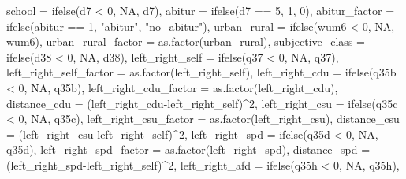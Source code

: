 \documentclass[
]{article}
\newenvironment{Shaded}{\begin{snugshade}}{\end{snugshade}}
\newcommand{\AttributeTok}[1]{\textcolor[rgb]{0.77,0.63,0.00}{#1}}
\newcommand{\ConstantTok}[1]{\textcolor[rgb]{0.00,0.00,0.00}{#1}}
\newcommand{\DecValTok}[1]{\textcolor[rgb]{0.00,0.00,0.81}{#1}}
\newcommand{\FunctionTok}[1]{\textcolor[rgb]{0.00,0.00,0.00}{#1}}
\newcommand{\NormalTok}[1]{#1}
\newcommand{\SpecialCharTok}[1]{\textcolor[rgb]{0.00,0.00,0.00}{#1}}
\newcommand{\StringTok}[1]{\textcolor[rgb]{0.31,0.60,0.02}{#1}}
\begin{document}
\begin{Shaded}
\begin{Highlighting}[]
         \AttributeTok{school =} \FunctionTok{ifelse}\NormalTok{(d7 }\SpecialCharTok{\textless{}} \DecValTok{0}\NormalTok{, }\ConstantTok{NA}\NormalTok{, d7),}
         \AttributeTok{abitur =} \FunctionTok{ifelse}\NormalTok{(d7 }\SpecialCharTok{==} \DecValTok{5}\NormalTok{, }\DecValTok{1}\NormalTok{, }\DecValTok{0}\NormalTok{),}
         \AttributeTok{abitur\_factor =} \FunctionTok{ifelse}\NormalTok{(abitur }\SpecialCharTok{==} \DecValTok{1}\NormalTok{, }\StringTok{"abitur"}\NormalTok{, }\StringTok{"no\_abitur"}\NormalTok{),}
         \AttributeTok{urban\_rural =} \FunctionTok{ifelse}\NormalTok{(wum6 }\SpecialCharTok{\textless{}} \DecValTok{0}\NormalTok{, }\ConstantTok{NA}\NormalTok{, wum6),}
         \AttributeTok{urban\_rural\_factor =} \FunctionTok{as.factor}\NormalTok{(urban\_rural),}
         \AttributeTok{subjective\_class =} \FunctionTok{ifelse}\NormalTok{(d38 }\SpecialCharTok{\textless{}} \DecValTok{0}\NormalTok{, }\ConstantTok{NA}\NormalTok{, d38),}
         \AttributeTok{left\_right\_self =} \FunctionTok{ifelse}\NormalTok{(q37 }\SpecialCharTok{\textless{}} \DecValTok{0}\NormalTok{, }\ConstantTok{NA}\NormalTok{, q37),}
         \AttributeTok{left\_right\_self\_factor =} \FunctionTok{as.factor}\NormalTok{(left\_right\_self),}
         \AttributeTok{left\_right\_cdu =} \FunctionTok{ifelse}\NormalTok{(q35b }\SpecialCharTok{\textless{}} \DecValTok{0}\NormalTok{, }\ConstantTok{NA}\NormalTok{, q35b),}
         \AttributeTok{left\_right\_cdu\_factor =} \FunctionTok{as.factor}\NormalTok{(left\_right\_cdu),}
         \AttributeTok{distance\_cdu =}\NormalTok{ (left\_right\_cdu}\SpecialCharTok{{-}}\NormalTok{left\_right\_self)}\SpecialCharTok{\^{}}\DecValTok{2}\NormalTok{,}
         \AttributeTok{left\_right\_csu =} \FunctionTok{ifelse}\NormalTok{(q35c }\SpecialCharTok{\textless{}} \DecValTok{0}\NormalTok{, }\ConstantTok{NA}\NormalTok{, q35c),}
         \AttributeTok{left\_right\_csu\_factor =} \FunctionTok{as.factor}\NormalTok{(left\_right\_csu),}
         \AttributeTok{distance\_csu =}\NormalTok{ (left\_right\_csu}\SpecialCharTok{{-}}\NormalTok{left\_right\_self)}\SpecialCharTok{\^{}}\DecValTok{2}\NormalTok{,}
         \AttributeTok{left\_right\_spd =} \FunctionTok{ifelse}\NormalTok{(q35d }\SpecialCharTok{\textless{}} \DecValTok{0}\NormalTok{, }\ConstantTok{NA}\NormalTok{, q35d),}
         \AttributeTok{left\_right\_spd\_factor =} \FunctionTok{as.factor}\NormalTok{(left\_right\_spd),}
         \AttributeTok{distance\_spd =}\NormalTok{ (left\_right\_spd}\SpecialCharTok{{-}}\NormalTok{left\_right\_self)}\SpecialCharTok{\^{}}\DecValTok{2}\NormalTok{,}
         \AttributeTok{left\_right\_afd =} \FunctionTok{ifelse}\NormalTok{(q35h }\SpecialCharTok{\textless{}} \DecValTok{0}\NormalTok{, }\ConstantTok{NA}\NormalTok{, q35h),}

\end{Highlighting}
\end{Shaded}
\end{document}
